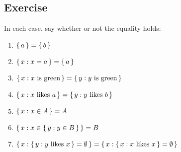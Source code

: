 \documentclass[letterpaper,parskip=half]{scrartcl}
\begin{document}
\subsection{Exercise}
\label{sec:org6250a8e}

In each case, say whether or not the equality holds:

\begin{enumerate}
\item \(\set{a} = \set{b}\)
\item \(\set{x : x = a} = \set{a}\)
\item \(\set{x : x\text{ is green} } = \set{y : y\text{ is green} }\)
\item \(\set{x : x\text{ likes }a } = \set{y : y\text{ likes }b }\)
\item \(\set{x : x \in A} = A\)
\item \(\set{x : x \in  \set{y : y \in  B}} = B\)
\item \(\set{x : \set{y : y\text{ likes }x } = \emptyset } = \set{x : \set{x : x\text{ likes }x } = \emptyset }\)
\end{enumerate}


\printbibliography
\end{document}
